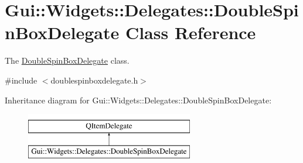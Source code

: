 \hypertarget{classGui_1_1Widgets_1_1Delegates_1_1DoubleSpinBoxDelegate}{\section{Gui\-:\-:Widgets\-:\-:Delegates\-:\-:Double\-Spin\-Box\-Delegate Class Reference}
\label{classGui_1_1Widgets_1_1Delegates_1_1DoubleSpinBoxDelegate}
}


The \hyperlink{classGui_1_1Widgets_1_1Delegates_1_1DoubleSpinBoxDelegate}{Double\-Spin\-Box\-Delegate} class.  




{\ttfamily \#include $<$doublespinboxdelegate.\-h$>$}

Inheritance diagram for Gui\-:\-:Widgets\-:\-:Delegates\-:\-:Double\-Spin\-Box\-Delegate\-:\begin{figure}[H]
\begin{center}
\leavevmode
\includegraphics[height=2.000000cm]{da/d53/classGui_1_1Widgets_1_1Delegates_1_1DoubleSpinBoxDelegate}
\end{center}
\end{figure}
